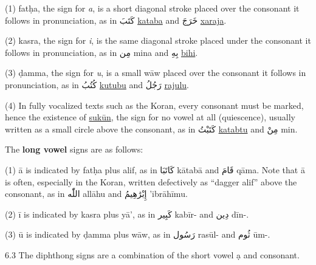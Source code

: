 \documentclass{article}
\newcommand{\ar}[1]{{\arabicfont #1}}
\begin{document}
(1) fat\d{h}a, the sign for \textit{a}, is a short diagonal stroke placed over the consonant it follows
in pronunciation, as in \ar{كَتَبَ} \underline{kataba} and \ar{خَرَجَ} \underline{xaraja}.

\vspace{0.8em}

(2) kasra, the sign for \textit{i}, is the same diagonal stroke placed under the consonant it
follows in pronunciation, as in \ar{مِن} mina and \ar{بِهِ} \underline{bihi}.

\vspace{0.8em}

(3) \d{d}amma, the sign for \textit{u}, is a small w\={a}w placed over the consonant it follows in
pronunciation, as in \ar{كُتُبُ} \underline{kutubu} and \ar{رَجُلُ} \underline{rajulu}.

\vspace{0.8em}

(4) In fully vocalized texts such as the Koran, every consonant must be marked, hence
the existence of \underline{suk\={u}n}, the sign for no vowel at all (quiescence), usually written as a
small circle above the consonant, as in \ar{كَتَبْتُ} \underline{katabtu} and \ar{مِنْ} min.

\vspace{1.5em}

\begin{center}
The \textbf{long vowel} signs are as follows:
\end{center}

\vspace{0.5em}

(1) \={a} is indicated by fat\d{h}a plus alif, as in \ar{كَاتَبَا} k\={a}tab\={a} and \ar{قَامَ} q\={a}ma.
Note that \={a} is often, especially in the Koran, written defectively as ``dagger alif'' above
the consonant, as in \ar{اللّٰه} all\={a}hu and \ar{إِبْرَٰهِيمُ} 'ibr\={a}h\={i}mu.

\vspace{0.8em}

(2) \={i} is indicated by kasra plus y\={a}', as in \ar{كَبِير} kab\={i}r- and \ar{دِين} d\={i}n-.

\vspace{0.8em}

(3) \={u} is indicated by \d{d}amma plus w\={a}w, as in \ar{رَسُول} ras\={u}l- and \ar{ثُوم} \texttheta\={u}m-.

\vspace{1.5em}

6.3 The diphthong signs are a combination of the short vowel \d{a} and consonant.
\end{document}
